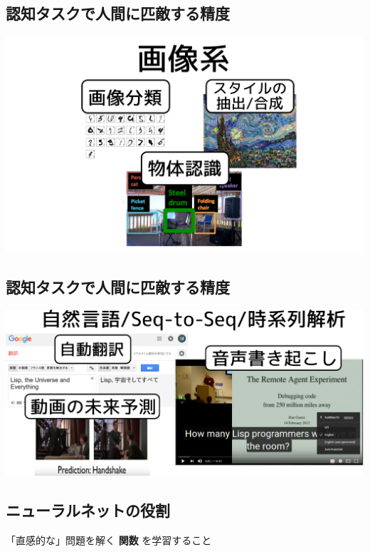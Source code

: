 \subsection{認知タスクで人間に匹敵する精度}
\label{sec:orgheadline28}

\includegraphics{img/deeplearning/image-task.png}

\subsection{認知タスクで人間に匹敵する精度}
\label{sec:orgheadline29}

\includegraphics{img/deeplearning/nlp-task.png}

\subsection{ニューラルネットの役割}
\label{sec:orgheadline30}

\begin{center}
「直感的な」問題を解く \textbf{関数} を学習すること
\end{center}


